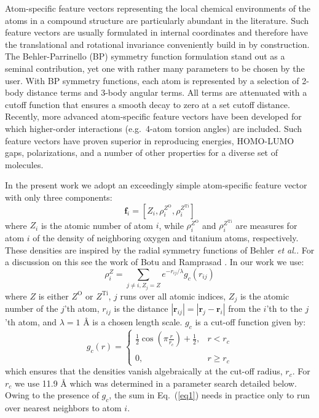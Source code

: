 \documentclass[aip,amsmath,amssymb,reprint]{revtex4-1}
\begin{document}
Atom-specific feature vectors representing the local
chemical environments of the atoms in a compound structure are
particularly abundant in the literature. Such feature vectors are usually
formulated in internal coordinates and therefore have the translational
and rotational invariance conveniently build in by construction. The Behler-Parrinello (BP)
symmetry function formulation\cite{behler_parrinello} stand out as a seminal
contribution, yet one with rather many parameters to be chosen by the
user. With BP symmetry functions, each atom is represented by a selection
of 2-body distance terms and 3-body angular terms. All terms are
attenuated with a cutoff function that ensures a smooth decay to
zero at a set cutoff distance.  Recently, more advanced atom-specific feature vectors
have been developed for which higher-order interactions (e.g.\ 4-atom torsion angles) are included.
Such feature vectors have proven superior in reproducing energies,
HOMO-LUMO gaps, polarizations, and a number of other properties for a
diverse set of molecules.\cite{dihedral_representation}

In the present work we adopt an exceedingly simple atom-specific
feature vector with only three components:
\begin{equation}
\mathbf{f}_i=\left[Z_i,\rho_i^{Z^\mathrm{O}},\rho_i^{Z^\mathrm{Ti}}\right]\label{eq_feature}
\end{equation}
where $Z_i$ is the atomic number of atom $i$, while
$\rho_i^{Z^\mathrm{O}}$ and $\rho_i^{Z^\mathrm{Ti}}$ are measures for
atom $i$ of the density of neighboring oxygen and titanium atoms,
respectively. These densities are inspired by the radial symmetry
functions of Behler \textit{et al.}\cite{behler_parrinello}. For a discussion on this see the work of Botu
and Ramprasad \cite{Botu2015}. In our work we use:
\begin{equation}
\rho_i^Z = \sum_{j\ne i,Z_j=Z} e^{-r_{ij}/\lambda}g_c(r_{ij})  \label{eq1}
\end{equation}
where $Z$ is either $Z^\mathrm{O}$ or $Z^\mathrm{Ti}$, $j$ runs over
all atomic indices, $Z_j$ is the atomic number of the $j$'th atom, $r_{ij}$ is the distance $|\mathbf r_{ij}|=|\mathbf r_j-
\mathbf r_i|$ from the $i$'th to the $j$'th atom, and
$\lambda=1$ {\AA} is a chosen length scale. $g_c$ is a cut-off
function given by:
\begin{equation}
g_c(r)=
\left\{\begin{array}{ll}
\frac{1}{2}{\cos(\pi \frac{r}{r_c})+\frac{1}{2}},&r<r_c\\
\\
0,&r\ge r_c
\end{array}
\right.
\end{equation}
which ensures that the densities vanish algebraically at the cut-off
radius, $r_c$. For $r_c$ we use 11.9 {\AA} which was determined in a parameter search detailed below.
Owing to the presence of $g_c$, the sum in Eq.\ (\ref{eq1}) needs
in practice only to run over nearest neighbors to atom $i$.
\end{document}
